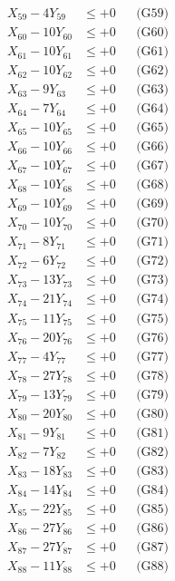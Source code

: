 \documentclass[a4paper,10pt]{article}
\begin{document}
{\begin{align}
X_{59} - 4Y_{59} &\leq +0 && \text{(G59)} \\
X_{60} - 10Y_{60} &\leq +0 && \text{(G60)} \\
X_{61} - 10Y_{61} &\leq +0 && \text{(G61)} \\
X_{62} - 10Y_{62} &\leq +0 && \text{(G62)} \\
X_{63} - 9Y_{63} &\leq +0 && \text{(G63)} \\
X_{64} - 7Y_{64} &\leq +0 && \text{(G64)} \\
X_{65} - 10Y_{65} &\leq +0 && \text{(G65)} \\
X_{66} - 10Y_{66} &\leq +0 && \text{(G66)} \\
X_{67} - 10Y_{67} &\leq +0 && \text{(G67)} \\
\allowbreak
X_{68} - 10Y_{68} &\leq +0 && \text{(G68)} \\
X_{69} - 10Y_{69} &\leq +0 && \text{(G69)} \\
X_{70} - 10Y_{70} &\leq +0 && \text{(G70)} \\
X_{71} - 8Y_{71} &\leq +0 && \text{(G71)} \\
X_{72} - 6Y_{72} &\leq +0 && \text{(G72)} \\
X_{73} - 13Y_{73} &\leq +0 && \text{(G73)} \\
X_{74} - 21Y_{74} &\leq +0 && \text{(G74)} \\
X_{75} - 11Y_{75} &\leq +0 && \text{(G75)} \\
X_{76} - 20Y_{76} &\leq +0 && \text{(G76)} \\
X_{77} - 4Y_{77} &\leq +0 && \text{(G77)} \\
\allowbreak
X_{78} - 27Y_{78} &\leq +0 && \text{(G78)} \\
X_{79} - 13Y_{79} &\leq +0 && \text{(G79)} \\
X_{80} - 20Y_{80} &\leq +0 && \text{(G80)} \\
X_{81} - 9Y_{81} &\leq +0 && \text{(G81)} \\
X_{82} - 7Y_{82} &\leq +0 && \text{(G82)} \\
X_{83} - 18Y_{83} &\leq +0 && \text{(G83)} \\
X_{84} - 14Y_{84} &\leq +0 && \text{(G84)} \\
X_{85} - 22Y_{85} &\leq +0 && \text{(G85)} \\
X_{86} - 27Y_{86} &\leq +0 && \text{(G86)} \\
X_{87} - 27Y_{87} &\leq +0 && \text{(G87)} \\
\allowbreak
X_{88} - 11Y_{88} &\leq +0 && \text{(G88)} \\

\end{align}}
\end{document}

